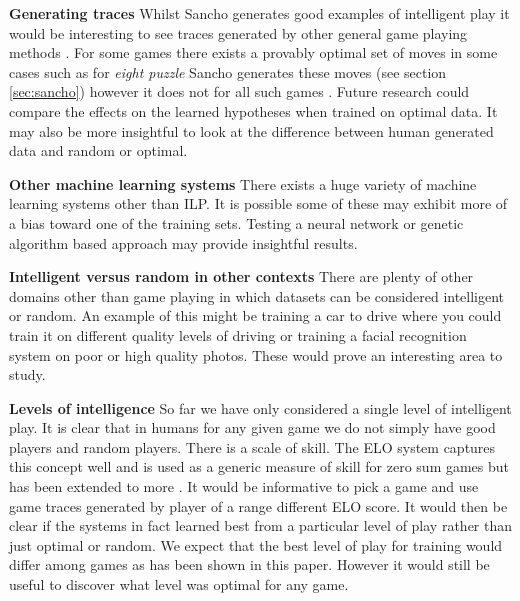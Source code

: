 \textbf{Generating traces} Whilst Sancho generates good examples of intelligent play it would be interesting to see traces generated by other general game playing methods \cite{Park/GGPAdvances,Kowalski/GGP}. For some games there exists a provably optimal set of moves in some cases such as for \textit{eight puzzle} Sancho generates these moves (see section \ref{sec:sancho}) however it does not for all such games \cite{Schaeffer/Checkers}. Future research could compare the effects on the learned hypotheses when trained on optimal data. It may also be more insightful to look at the difference between human generated data and random or optimal.

\textbf{Other machine learning systems} There exists a huge variety of machine learning systems other than ILP. It is possible some of these may exhibit more of a bias toward one of the training sets. Testing a neural network or genetic algorithm based approach may provide insightful results.

\textbf{Intelligent versus random in other contexts} There are plenty of other domains other than game playing in which datasets can be considered intelligent or random. An example of this might be training a car to drive where you could train it on different quality levels of driving or training a facial recognition system on poor or high quality photos. These would prove an interesting area to study.

\textbf{Levels of intelligence} So far we have only considered a single level of intelligent play. It is clear that in humans for any given game we do not simply have good players and random players. There is a scale of skill. The ELO system captures this concept well and is used as a generic measure of skill for zero sum games but has been extended to more \cite{ELO}. It would be informative to pick a game and use game traces generated by player of a range different ELO score. It would then be clear if the systems in fact learned best from a particular level of play rather than just optimal or random. We expect that the best level of play for training would differ among games as has been shown in this paper. However it would still be useful to discover what level was optimal for any game. 

